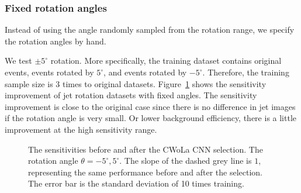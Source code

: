 \documentclass[12pt]{article}
\begin{document}
		\subsubsection{Fixed rotation angles}%
		\label{subs:fixed_rotation_angles}
			Instead of using the angle randomly sampled from the rotation range, we specify the rotation angles by hand.

			We test $\pm 5^\circ$ rotation. More specifically, the training dataset contains original events, events rotated by $5^\circ$, and events rotated by $-5^\circ$. Therefore, the training sample size is 3 times to original datasets. Figure~\ref{fig:sensitivity_improvement_origin_jet_aug_angles_-5_5} shows the sensitivity improvement of jet rotation datasets with fixed angles. The sensitivity improvement is close to the original case since there is no difference in jet images if the rotation angle is very small. Or lower background efficiency, there is a little improvement at the high sensitivity range.
		\begin{figure}[htpb]
			\centering
			\caption{The sensitivities before and after the CWoLa CNN selection. The rotation angle $\theta = -5^\circ, 5^\circ$. The slope of the dashed grey line is $1$, representing the same performance before and after the selection. The error bar is the standard deviation of 10 times training.}
			\label{fig:sensitivity_improvement_origin_jet_aug_angles_-5_5}
		\end{figure}
\end{document}
